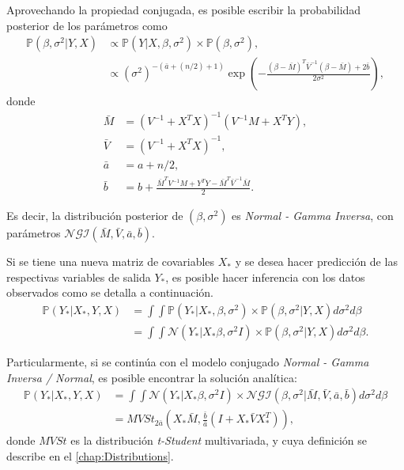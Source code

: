 Aprovechando la propiedad conjugada, es posible escribir la probabilidad posterior de los par\'ametros como
\begin{equation*}
\begin{aligned}
    \mathbb{P}(\beta,\sigma^2 | Y, X) 
    &\propto \mathbb{P}(Y| X, \beta, \sigma^2) \times \mathbb{P}(\beta, \sigma^2), \\
    &\propto (\sigma^2)^{-(\bar{a}+(n/2)+1)} \exp\left(-\frac{(\beta-\bar{M})^T\bar{V}^{-1}(\beta-\bar{M}) + 2\bar{b}}{2\sigma^2}\right),
\end{aligned}
\end{equation*}
donde
\begin{equation*}
\begin{aligned}
    \bar{M} &= (V^{-1} + X^TX)^{-1} (V^{-1}M + X^TY), \\
    \bar{V} &= (V^{-1} + X^TX)^{-1}, \\
    \bar{a} &= a + n/2, \\
    \bar{b} &= b + \frac{\bar{M}^TV^{-1}M + Y^TY - \bar{M}^T\bar{V}^{-1}\bar{M}}{2}.
\end{aligned}
\end{equation*}

Es decir, la distribuci\'on posterior de $(\beta,\sigma^2)$ es \textit{Normal - Gamma Inversa}, con par\'ametros $\mathcal{NGI}(\bar{M},\bar{V},\bar{a},\bar{b})$.

Si se tiene una nueva matriz de covariables $X_*$ y se desea hacer predicci\'on de las respectivas variables de salida $Y_*$, es posible hacer inferencia con los datos observados como se detalla a continuaci\'on.
\begin{equation*}
\begin{aligned}
    \mathbb{P}(Y_*|X_*,Y,X)
    &= \int \int \mathbb{P}(Y_*|X_*,\beta,\sigma^2) \times \mathbb{P}(\beta,\sigma^2|Y,X) d\sigma^2 d\beta \\
    &= \int \int \mathcal{N}(Y_*|X_*\beta,\sigma^2I) \times \mathbb{P}(\beta,\sigma^2|Y,X) d\sigma^2 d\beta.
\end{aligned}
\end{equation*}

Particularmente, si se contin\'ua con el modelo conjugado \textit{Normal - Gamma Inversa / Normal}, es posible encontrar la soluci\'on anal\'itica:
\begin{equation*}
\begin{aligned}
    \mathbb{P}(Y_*|X_*,Y,X)
    &= \int \int \mathcal{N}(Y_*|X_*\beta,\sigma^2I) \times \mathcal{NGI}(\beta,\sigma^2|\bar{M},\bar{V},\bar{a},\bar{b}) d\sigma^2 d\beta \\
    &= MVSt_{2\bar{a}} 
       \left(
        X_*\bar{M},\frac{\bar{b}}{\bar{a}}\left(I + X_*\bar{V}X_*^T\right)
       \right),
\end{aligned}
\end{equation*}
donde $MVSt$ es la distribuci\'on \textit{t-Student} multivariada, y cuya definici\'on se describe en el \autoref{chap:Distributions}.

